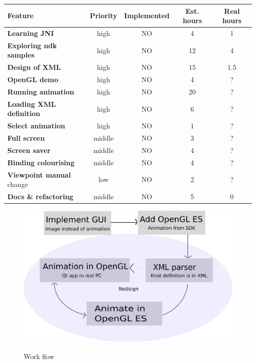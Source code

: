 \begin{tabular}{| l || c | c |  c | c |}
\hline
Feature & Priority & Implemented & Est. hours & Real hours\\
\hline
\textbf{Learning JNI} & high & NO & 4 & 1\\
\textbf{Exploring ndk samples} & high & NO & 12 & 4\\
\textbf{Design of XML} & high & NO & 15 & 1.5\\
\textbf{OpenGL demo} & high & NO & 4 & ?\\
\textbf{Running animation} & high & NO & 20 & ?\\
\textbf{Loading XML definition} & high & NO & 6 & ?\\
\textbf{Select animation} & high & NO & 1 & ?\\
\textbf{Full screen} & middle & NO & 3 & ?\\
\textbf{Screen saver} & middle & NO & 4 & ?\\
\textbf{Binding colourising} & middle & NO & 4 & ?\\
\textbf{Viewpoint manual} change & low & NO & 2 & ?\\
\textbf{Docs \& refactoring} & middle & NO & 5 & 0\\
\hline
\end{tabular}
\begin{figure}
\includegraphics{work_flow.eps}
\label{work_flow}
\caption{Work flow}
\end{figure}


